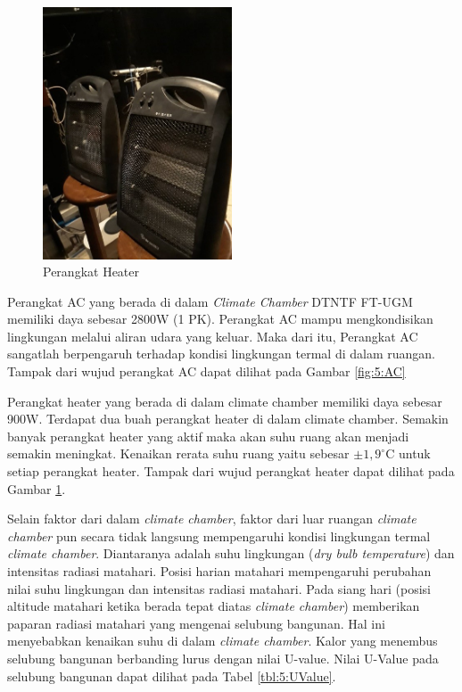 \begin{figure}[!h]
	\centering
	\includegraphics[width=0.5\textwidth]{figures/Heater}
	\caption{Perangkat Heater}
	\label{fig:5:Heater}
\end{figure}

Perangkat AC yang berada di dalam \textit{Climate Chamber} DTNTF FT-UGM memiliki daya sebesar 2800W (1 PK). Perangkat AC mampu mengkondisikan lingkungan melalui aliran udara yang keluar. Maka dari itu, Perangkat AC sangatlah berpengaruh terhadap kondisi lingkungan termal di dalam ruangan. Tampak dari wujud perangkat AC dapat dilihat pada Gambar \ref{fig:5:AC}

Perangkat heater yang berada di dalam climate chamber memiliki daya sebesar 900W. Terdapat dua buah perangkat heater di dalam climate chamber. Semakin banyak perangkat heater yang aktif maka akan suhu ruang akan menjadi semakin meningkat. Kenaikan rerata suhu ruang yaitu sebesar $\pm1,9^\circ$C untuk setiap perangkat heater. Tampak dari wujud perangkat heater dapat dilihat pada Gambar \ref{fig:5:Heater}.

Selain faktor dari dalam \textit{climate chamber}, faktor dari luar ruangan \textit{climate chamber} pun secara tidak langsung mempengaruhi kondisi lingkungan termal \textit{climate chamber}. Diantaranya adalah suhu lingkungan (\textit{dry bulb temperature}) dan intensitas radiasi matahari. Posisi harian matahari mempengaruhi perubahan nilai suhu lingkungan dan intensitas radiasi matahari. Pada siang hari (posisi altitude matahari ketika berada tepat diatas \textit{climate chamber}) memberikan paparan radiasi matahari yang mengenai selubung bangunan. Hal ini menyebabkan kenaikan suhu di dalam \textit{climate chamber}. Kalor yang menembus selubung bangunan berbanding lurus dengan nilai U-value. Nilai U-Value pada selubung bangunan dapat dilihat pada Tabel \ref{tbl:5:UValue}.\\

